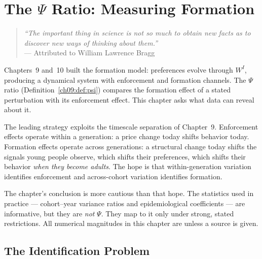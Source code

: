 \documentclass[../structural_economics_book.tex]{subfiles}
\begin{document}
\ifSubfilesClassLoaded{\setcounter{chapter}{10}}{}
\chapter{The $\Psi$ Ratio: Measuring Formation}\label{ch:11}
\begin{quote}
\textit{``The important thing in science is not so much to obtain new facts as to discover new ways of thinking about them.''}\\
\hfill --- Attributed to William Lawrence Bragg
\end{quote}

\vspace{1em}

Chapters~9 and~10 built the formation model: preferences evolve through $W^I$, producing a dynamical system with enforcement and formation channels. The $\Psi$ ratio (Definition~\ref{ch09:def:psi}) compares the formation effect of a stated perturbation with its enforcement effect. This chapter asks what data can reveal about it.

The leading strategy exploits the timescale separation of Chapter~9. Enforcement effects operate within a generation: a price change today shifts behavior today. Formation effects operate across generations: a structural change today shifts the signals young people observe, which shifts their preferences, which shifts their behavior \textit{when they become adults}. The hope is that within-generation variation identifies enforcement and across-cohort variation identifies formation.

The chapter's conclusion is more cautious than that hope. The statistics used in practice --- cohort--year variance ratios and epidemiological coefficients --- are informative, but they are \textit{not} $\Psi$. They map to it only under strong, stated restrictions. All numerical magnitudes in this chapter are \illustrative{} unless a source is given.


\section{The Identification Problem}
\label{ch11:sec:identification}
\end{document}
